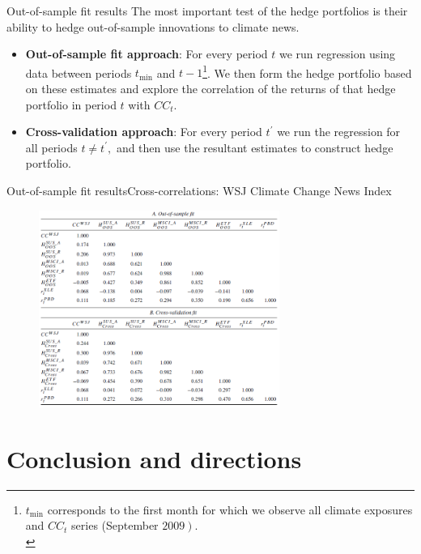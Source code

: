 \begin{frame}{Out-of-sample fit results}
	The most important test of the hedge portfolios is their ability to hedge out-of-sample innovations to climate news.
	\medskip

	\begin{itemize}
		\item \textbf{Out-of-sample fit approach}: For every period $t$ we run regression using data between periods $t_{\min }$ and $t-1$\footnote{$t_{\min }$ corresponds to the first month for which we observe all climate exposures and $C C_{t}$ series (September $\left.2009\right)$.\\}. We then form the hedge portfolio based on these estimates and explore the correlation of the returns of that hedge portfolio in period $t$ with $C C_{t} .$ 
		\item \textbf{Cross-validation approach}: For every period $t^{\prime}$ we run the regression for all periods $t \neq t^{\prime},$ and then use the resultant estimates to construct hedge portfolio.
	\end{itemize}	 
\end{frame}

\begin{frame}{Out-of-sample fit results}{Cross-correlations: WSJ Climate Change News Index}
	\begin{figure}[hbdp]
	\centering
	\includegraphics[width=0.7\textwidth]{tab4.png}
	\end{figure} 	 
\end{frame}

\section{Conclusion and directions}

